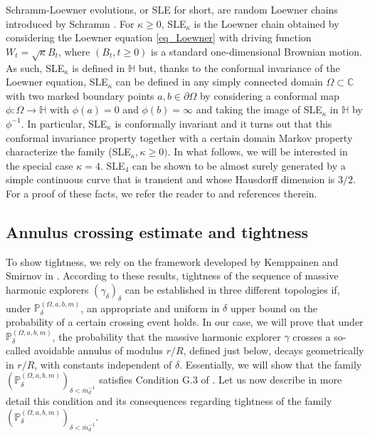 \documentclass{article}
\newcommand{\PP}{{\mathbb{P}}}
\newcommand{\HH}{{\mathbb{H}}}
\theoremstyle{definition}
\theoremstyle{remark}
\theoremstyle{remark}
\begin{document}
Schramm-Loewner evolutions, or SLE for short, are random Loewner chains introduced by Schramm \cite{Schramm_SLE}. For $\kappa \geq 0$, SLE$_\kappa$ is the Loewner chain obtained by considering the Loewner equation \eqref{eq_Loewner} with driving function $W_t = \sqrt{\kappa}B_t$, where $(B_t, t \geq 0)$ is a standard one-dimensional Brownian motion. As such, SLE$_{\kappa}$ is defined in $\HH$ but, thanks to the conformal invariance of the Loewner equation, SLE$_{\kappa}$ can be defined in any simply connected domain $\Omega \subset \mathbb{C}$ with two marked boundary points $a, b \in \partial \Omega$ by considering a conformal map $\phi: \Omega \to \HH$ with $\phi(a)=0$ and $\phi(b) = \infty$ and taking the image of SLE$_{\kappa}$ in $\HH$ by $\phi^{-1}$. In particular, SLE$_{\kappa}$ is conformally invariant and it turns out that this conformal invariance property together with a certain domain Markov property characterize the family (SLE$_{\kappa}, \kappa \geq 0)$. In what follows, we will be interested in the special case $\kappa =4$. SLE$_4$ can be shown to be almost surely generated by a simple continuous curve that is transient and whose Hausdorff dimension is $3/2$. For a proof of these facts, we refer the reader to \cite[Chapter~5]{book_SLE} and references therein.

\subsection{Annulus crossing estimate and tightness} \label{sec_annulus_cross}

To show tightness, we rely on the framework developed by Kemppainen and Smirnov in \cite{Smirnov}. According to these results, tightness of the sequence of massive harmonic explorers $(\gamma_{\delta})_{\delta}$ can be established in three different topologies if, under $\PP_{\delta}^{(\Omega, a, b, m)}$, an appropriate and uniform in $\delta$ upper bound on the probability of a certain crossing event holds. In our case, we will prove that under $\PP_{\delta}^{(\Omega, a, b, m)}$, the probability that the massive harmonic explorer $\gamma$ crosses a so-called avoidable annulus of modulus $r/R$, defined just below, decays geometrically in $r/R$, with constants independent of $\delta$. Essentially, we will show that the family $(\PP_{\delta}^{(\Omega,a,b,m)})_{\delta < \overline{m}_d^{-1}}$ satisfies Condition G.3 of \cite{Smirnov}. Let us now describe in more detail this condition and its consequences regarding tightness of the family $(\PP_{\delta}^{(\Omega,a,b,m)})_{\delta < \overline{m}_d^{-1}}$.
\end{document}
